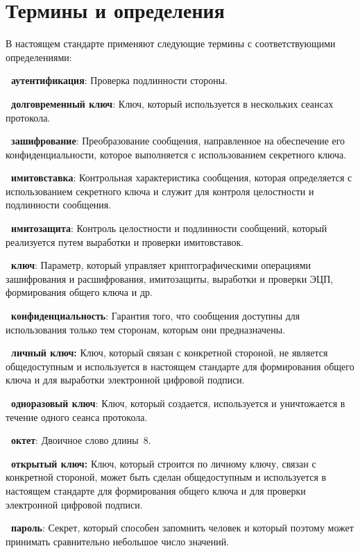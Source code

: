 \chapter{Термины и определения}

В настоящем стандарте применяют
следующие термины с соответствующими определениями:

{\bf \thedefctr~аутентификация}:
Проверка подлинности стороны.

{\bf \thedefctr~долговременный ключ}:
Ключ, который используется в нескольких сеансах протокола.

{\bf \thedefctr~зашифрование}:
Преобразование сообщения,
направленное на обеспечение его конфиденциальности,
которое выполняется с использованием секретного ключа.

{\bf \thedefctr~имитовставка}:
Контрольная характеристика сообщения, 
которая определяется с использованием секретного ключа 
и служит для контроля целостности и подлинности сообщения.

{\bf \thedefctr~имитозащита}:
Контроль целостности и подлинности сообщений, 
который реализуется путем выработки и проверки имитовставок.

{\bf \thedefctr~ключ}:
Параметр, который управляет криптографическими 
операциями зашифрования и расшифрования, 
имитозащиты, выработки и проверки ЭЦП, 
формирования общего ключа и др.

{\bf \thedefctr~конфиденциальность}:
Гарантия того, что сообщения доступны для использования
только тем сторонам, которым они предназначены.

{\bf \thedefctr~личный ключ:}
Ключ, который связан с конкретной стороной, не является общедоступным и
используется в настоящем стандарте для формирования общего ключа и для выработки
электронной цифровой подписи.


{\bf \thedefctr~одноразовый ключ}:
Ключ, который создается, используется и уничтожается в течение одного 
сеанса протокола.

{\bf \thedefctr~октет}:
Двоичное слово длины~$8$.

{\bf \thedefctr~открытый ключ:}
Ключ, который строится по личному ключу, связан с конкретной стороной, 
может быть сделан общедоступным и используется в настоящем стандарте 
для формирования общего ключа и для проверки 
электронной цифровой подписи.

{\bf \thedefctr~пароль}:
Секрет, который способен запомнить человек и 
который поэтому может принимать сравнительно небольшое 
число значений.
            
